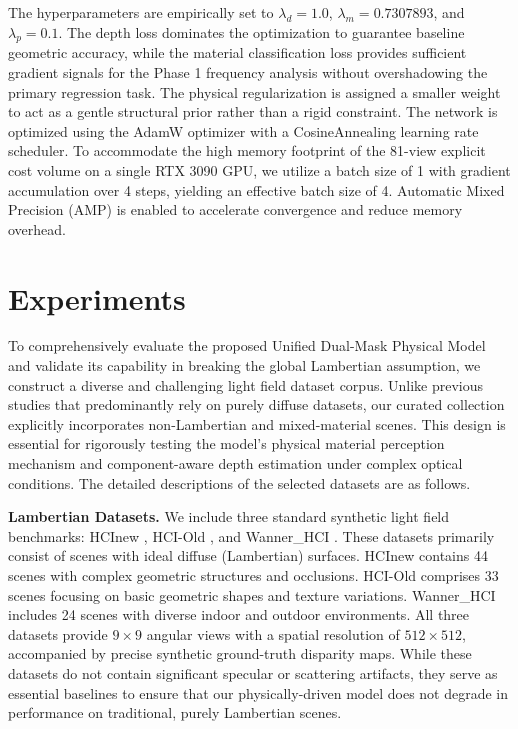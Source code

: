 \documentclass[lettersize,journal]{IEEEtran}
\begin{document}
The hyperparameters are empirically set to $\lambda_{d} = 1.0$, $\lambda_{m} = 0.7307893$, and $\lambda_{p} = 0.1$. The depth loss dominates the optimization to guarantee baseline geometric accuracy, while the material classification loss provides sufficient gradient signals for the Phase 1 frequency analysis without overshadowing the primary regression task. The physical regularization is assigned a smaller weight to act as a gentle structural prior rather than a rigid constraint. The network is optimized using the AdamW optimizer with a CosineAnnealing learning rate scheduler. To accommodate the high memory footprint of the 81-view explicit cost volume on a single RTX 3090 GPU, we utilize a batch size of 1 with gradient accumulation over 4 steps, yielding an effective batch size of 4. Automatic Mixed Precision (AMP) is enabled to accelerate convergence and reduce memory overhead.

\section{Experiments}

To comprehensively evaluate the proposed Unified Dual-Mask Physical Model and validate its capability in breaking the global Lambertian assumption, we construct a diverse and challenging light field dataset corpus. Unlike previous studies that predominantly rely on purely diffuse datasets, our curated collection explicitly incorporates non-Lambertian and mixed-material scenes. This design is essential for rigorously testing the model's physical material perception mechanism and component-aware depth estimation under complex optical conditions. The detailed descriptions of the selected datasets are as follows.

\textbf{Lambertian Datasets.} We include three standard synthetic light field benchmarks: HCInew \cite{honauer2016hci}, HCI-Old \cite{honauer2016hci}, and Wanner\_HCI \cite{wanner2013light}. These datasets primarily consist of scenes with ideal diffuse (Lambertian) surfaces. HCInew contains 44 scenes with complex geometric structures and occlusions. HCI-Old comprises 33 scenes focusing on basic geometric shapes and texture variations. Wanner\_HCI includes 24 scenes with diverse indoor and outdoor environments. All three datasets provide $9 \times 9$ angular views with a spatial resolution of $512 \times 512$, accompanied by precise synthetic ground-truth disparity maps. While these datasets do not contain significant specular or scattering artifacts, they serve as essential baselines to ensure that our physically-driven model does not degrade in performance on traditional, purely Lambertian scenes.
\end{document}
